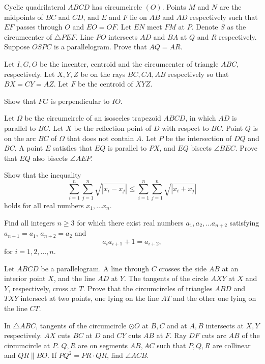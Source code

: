 \documentclass[11pt]{scrartcl}
\begin{document}
\begin{problem}[6612845742708555351]
	Cyclic quadrilateral $ABCD$ has circumcircle $(O)$. Points $M$ and $N$ are the midpoints of $BC$ and $CD$, and $E$ and $F$ lie on $AB$ and $AD$ respectively such that $EF$ passes through $O$ and $EO=OF$. Let $EN$ meet $FM$ at $P$. Denote $S$ as the circumcenter of $\triangle PEF$. Line $PO$ intersects $AD$ and $BA$ at $Q$ and $R$ respectively. Suppose $OSPC$ is a parallelogram. Prove that $AQ=AR$.
\end{problem}
\begin{problem}[6734490609685717062]
	Let $I,G,O$ be the incenter, centroid and the circumcenter of triangle $ABC$, respectively. Let $X,Y,Z$ be on the rays $BC, CA, AB$ respectively so that $BX=CY=AZ$. Let $F$ be the centroid of $XYZ$.

Show that $FG$ is perpendicular to $IO$.
\end{problem}
\begin{problem}[165465510156789]
	Let $\Omega$ be the circumcircle of an isosceles trapezoid $ABCD$, in which $AD$ is parallel to $BC$. Let $X$ be the reflection point of $D$ with respect to $BC$. Point $Q$ is on the arc $BC$ of $\Omega$ that does not contain $A$. Let $P$ be the intersection of $DQ$ and $BC$. A point $E$ satisfies that $EQ$ is parallel to $PX$, and $EQ$ bisects $\angle BEC$. Prove that $EQ$ also bisects $\angle AEP$.
\end{problem}
\begin{problem}[952584318797289]
Show that the inequality\[\sum_{i=1}^n \sum_{j=1}^n \sqrt{|x_i-x_j|}\leqslant \sum_{i=1}^n \sum_{j=1}^n \sqrt{|x_i+x_j|}\]holds for all real numbers $x_1,\ldots x_n.$
\end{problem}
\begin{problem}[574223786384294]
Find all integers $n \geq 3$ for which there exist real numbers $a_1, a_2, \dots a_{n + 2}$ satisfying $a_{n + 1} = a_1$, $a_{n + 2} = a_2$ and
$$a_ia_{i + 1} + 1 = a_{i + 2},$$for $i = 1, 2, \dots, n$.
\end{problem}
\begin{problem}[579228243242060]
Let $ABCD$ be a parallelogram. A line through $C$ crosses the side $AB$ at an interior point $X$,
and the line $AD$ at $Y$. The tangents of the circle $AXY$ at $X$ and $Y$, respectively, cross at $T$.
Prove that the circumcircles of triangles $ABD$ and $TXY$ intersect at two points, one lying on the line $AT$ and the other one lying on the line $CT$.
\end{problem}
\begin{problem}[162618813015033]
In $\triangle {ABC}$, tangents of the circumcircle $\odot {O}$ at $B, C$ and at $A, B$ intersects at $X, Y$ respectively. $AX$ cuts $BC$ at ${D}$ and $CY$ cuts $AB$ at ${F}$. Ray $DF$ cuts arc $AB$ of the circumcircle at ${P}$. $Q, R$ are on segments $AB, AC$ such that $P, Q, R$ are collinear and $QR \parallel BO$. If $PQ^2=PR \cdot QR$, find $\angle ACB$.
\end{problem}
\end{document}
